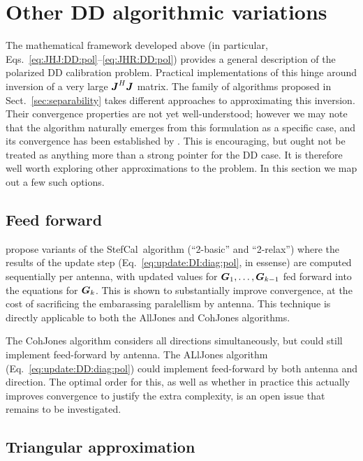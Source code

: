 \documentclass[useAMS,usenatbib]{mn2e}
\newcommand{\mat}[1]{{\bmath{#1}}}
\newcommand{\JJ}{\mat{J}} %
\newcommand{\GG}{\mat{G}}
\newcommand{\JHJ}{\JJ^H\JJ} %
\newcommand{\StefCal}{{\sc StefCal}}
\begin{document}
\section{Other DD algorithmic variations}

The mathematical framework developed above (in particular, Eqs.~\ref{eq:JHJ:DD:pol}--\ref{eq:JHR:DD:pol}) provides
a general description of the polarized DD calibration problem. Practical implementations of this hinge around inversion of
a very large $\JHJ$ matrix. The family of algorithms proposed in Sect.~\ref{sec:separability} takes different approaches
to approximating this inversion. Their convergence properties are not yet well-understood; however we may note that 
the {\sc \StefCal} algorithm naturally emerges from this formulation as a specific case, and its convergence has been 
established by \citet{Stefcal}. This is encouraging, but ought not be treated as anything more than a strong pointer for 
the DD case. It is therefore well worth exploring other approximations to the problem. In this section we map out a few 
such options.

\subsection{Feed forward}
\label{sec:feed-forward}

\citet{Stefcal} propose variants of the \StefCal\ algorithm (``2-basic'' and ``2-relax'') where the results of the 
update step (Eq.~\ref{eq:update:DI:diag:pol}, in essense) are computed sequentially per antenna, with updated
values for $\GG_1,\dots,\GG_{k-1}$ fed forward into the equations for $\GG_k$. This is shown to 
substantially improve convergence, at the cost of sacrificing the embarassing paralellism by antenna. This technique 
is directly applicable to both the {\sc AllJones} and {\sc CohJones} algorithms. 

The {\sc CohJones} algorithm considers all directions simultaneously, but could still implement feed-forward by antenna.
The {\sc ALlJones} algorithm (Eq.~\ref{eq:update:DD:diag:pol}) could implement feed-forward by both antenna and direction. 
The optimal order for this, as well as whether in practice this actually improves convergence to justify the extra 
complexity, is an open issue that remains to be investigated.

\subsection{Triangular approximation}
\end{document}
